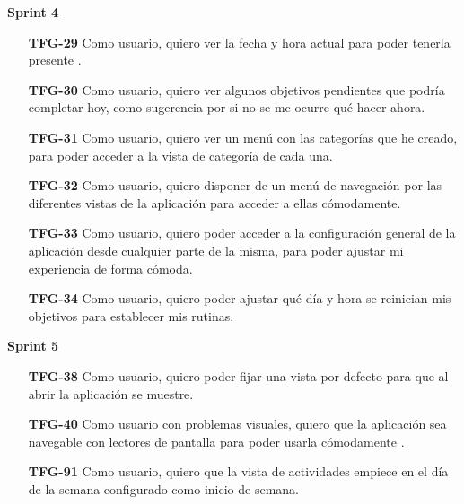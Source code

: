 \documentclass[10pt, a4paper]{aqademic}
\begin{document}
\textbf{Sprint 4}
\begin{itemize}[leftmargin=16mm]
	\item [\textbf{TFG-29}] Como usuario, quiero ver la fecha y hora actual para poder tenerla presente .

	\item [\textbf{TFG-30}] Como usuario, quiero ver algunos objetivos pendientes que podría completar hoy, como sugerencia por si no se me ocurre qué hacer ahora.
	
	\item [\textbf{TFG-31}] Como usuario, quiero ver un menú con las categorías que he creado, para poder acceder a la vista de categoría de cada una.
	
	\item [\textbf{TFG-32}] Como usuario, quiero disponer de un menú de navegación por las diferentes vistas de la aplicación para acceder a ellas cómodamente.
	
	\item [\textbf{TFG-33}] Como usuario, quiero poder acceder a la configuración general de la aplicación desde cualquier parte de la misma, para poder ajustar mi experiencia de forma cómoda.
	
	\item [\textbf{TFG-34}] Como usuario, quiero poder ajustar qué día y hora se reinician mis objetivos para establecer mis rutinas.
\end{itemize}

\textbf{Sprint 5}
\begin{itemize}[leftmargin=16mm]
	\item [\textbf{TFG-38}] Como usuario, quiero poder fijar una vista por defecto para que al abrir la aplicación se muestre.
	
	\item [\textbf{TFG-40}] Como usuario con problemas visuales, quiero que la aplicación sea navegable con lectores de pantalla para poder usarla cómodamente .
	
	\item [\textbf{TFG-91}] Como usuario, quiero que la vista de actividades empiece en el día de la semana configurado como inicio de semana.
\end{itemize}
\end{document}
